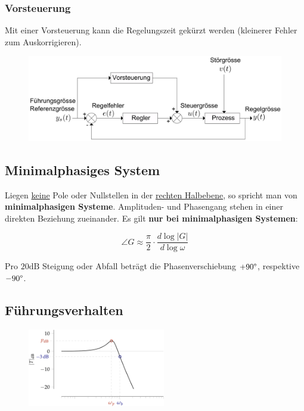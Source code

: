 \documentclass[
  10pt,
  a4paper,
  twocolumn]{article}
\numberwithin{equation}{section}
\begin{document}
\hypertarget{vorsteuerung}{%
\subsubsection{Vorsteuerung}\label{vorsteuerung}}

Mit einer Vorsteuerung kann die Regelungszeit gekürzt werden (kleinerer
Fehler zum Auskorrigieren).

\begin{figure}[H]

{\centering \includegraphics{images/paste-1.png}

}

\end{figure}

\hypertarget{minimalphasiges-system}{%
\subsection{Minimalphasiges System}\label{minimalphasiges-system}}

Liegen \ul{keine} Pole oder Nullstellen in der \ul{rechten Halbebene},
so spricht man von \textbf{minimalphasigen Systeme}. Amplituden- und
Phasengang stehen in einer direkten Beziehung zueinander. Es gilt
\textbf{nur bei minimalphasigen Systemen}:

\[
\angle{G}\approx\frac{\pi}{2}\cdot\frac{d{\log\lvert G\rvert}}{d{\log{\omega}}}
\]

Pro \(20\text{dB}\) Steigung oder Abfall beträgt die Phasenverschiebung
\(+90\degree\), respektive \(-90\degree\).

\hypertarget{fuxfchrungsverhalten}{%
\subsection{Führungsverhalten}\label{fuxfchrungsverhalten}}

\begin{figure}[H]

{\centering \includegraphics[width=6cm,height=\textheight]{images/paste-35.png}

}

\end{figure}
\end{document}
